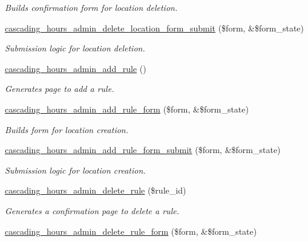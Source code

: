 \begin{DoxyCompactItemize}
\begin{DoxyCompactList}\small\item\em Builds confirmation form for location deletion. \end{DoxyCompactList}\item 
\hyperlink{cascading__hours_8admin_8php_a1a327a3b36e6b6338ea9407a7f14a5f9_a1a327a3b36e6b6338ea9407a7f14a5f9}{cascading\+\_\+hours\+\_\+admin\+\_\+delete\+\_\+location\+\_\+form\+\_\+submit} (\$form, \&\$form\+\_\+state)
\begin{DoxyCompactList}\small\item\em Submission logic for location deletion. \end{DoxyCompactList}\item 
\hyperlink{cascading__hours_8admin_8php_a3fe993a03c9e877a31e4842059e7e22a_a3fe993a03c9e877a31e4842059e7e22a}{cascading\+\_\+hours\+\_\+admin\+\_\+add\+\_\+rule} ()
\begin{DoxyCompactList}\small\item\em Generates page to add a rule. \end{DoxyCompactList}\item 
\hyperlink{cascading__hours_8admin_8php_adffbec174f6459c8e137c503546d85aa_adffbec174f6459c8e137c503546d85aa}{cascading\+\_\+hours\+\_\+admin\+\_\+add\+\_\+rule\+\_\+form} (\$form, \&\$form\+\_\+state)
\begin{DoxyCompactList}\small\item\em Builds form for location creation. \end{DoxyCompactList}\item 
\hyperlink{cascading__hours_8admin_8php_a3a9f1797a1338cb2e90712966361c4f3_a3a9f1797a1338cb2e90712966361c4f3}{cascading\+\_\+hours\+\_\+admin\+\_\+add\+\_\+rule\+\_\+form\+\_\+submit} (\$form, \&\$form\+\_\+state)
\begin{DoxyCompactList}\small\item\em Submission logic for location creation. \end{DoxyCompactList}\item 
\hyperlink{cascading__hours_8admin_8php_a31b87b732814d7f02f2e101376de5471_a31b87b732814d7f02f2e101376de5471}{cascading\+\_\+hours\+\_\+admin\+\_\+delete\+\_\+rule} (\$rule\+\_\+id)
\begin{DoxyCompactList}\small\item\em Generates a confirmation page to delete a rule. \end{DoxyCompactList}\item 
\hyperlink{cascading__hours_8admin_8php_a7940c215a217e5d798198fb4d0500e96_a7940c215a217e5d798198fb4d0500e96}{cascading\+\_\+hours\+\_\+admin\+\_\+delete\+\_\+rule\+\_\+form} (\$form, \&\$form\+\_\+state)

\end{DoxyCompactItemize}
